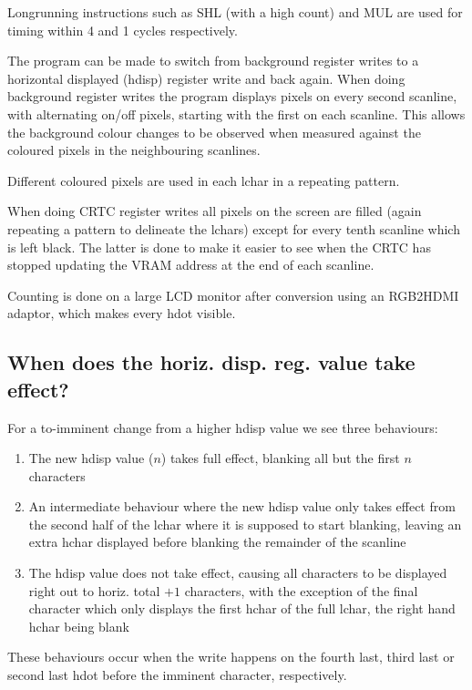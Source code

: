 \documentclass[a4paper,10pt]{amsart}
\begin{document}
Longrunning instructions such as SHL (with a high count) and MUL are used for
timing within 4 and 1 cycles respectively.

The program can be made to switch from background register writes to a
horizontal displayed (hdisp) register write and back again. When doing
background register writes the program displays pixels on every second
scanline, with alternating on/off pixels, starting with the first on each
scanline. This allows the background colour changes to be observed when
measured against the coloured pixels in the neighbouring scanlines.

Different coloured pixels are used in each lchar in a repeating pattern.

When doing CRTC register writes all pixels on the screen are filled (again
repeating a pattern to delineate the lchars) except for every tenth scanline
which is left black. The latter is done to make it easier to see when the
CRTC has stopped updating the VRAM address at the end of each scanline.

Counting is done on a large LCD monitor after conversion using an RGB2HDMI
adaptor, which makes every hdot visible.

\subsection{When does the horiz. disp. reg. value take effect?}

For a to-imminent change from a higher hdisp value we see three behaviours:

\begin{enumerate}
\item The new hdisp value ($n$) takes full effect, blanking all but the
first $n$ characters
\item An intermediate behaviour where the new hdisp value only takes effect
from the second half of the lchar where it is supposed to start blanking, leaving
an extra hchar displayed before blanking the remainder of the scanline
\item The hdisp value does not take effect, causing all characters to be
displayed right out to horiz. total $+1$ characters, with the exception
of the final character which only displays the first hchar of the full lchar,
the right hand hchar being blank
\end{enumerate}

These behaviours occur when the write happens on the fourth last, third last or
second last hdot before the imminent character, respectively.
\end{document}
